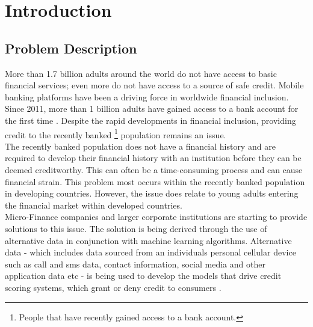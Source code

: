 \chapter{Introduction} 
\label{Chapter1}

\section{Problem Description}

More than 1.7 billion adults around the world do not have access to basic financial services; even more do not have access to a source of safe credit. Mobile banking platforms have been a driving force in worldwide financial inclusion. Since 2011, more than 1 billion adults have gained access to a bank account for the first time \parencite{WorldBank}. Despite the rapid developments in financial inclusion, providing credit to the recently banked \footnote{People that have recently gained access to a bank account.} population remains an issue. \\

The recently banked population does not have a financial history and are required to develop their financial history with an institution before they can be deemed creditworthy. This can often be a time-consuming process and can cause financial strain. This problem most occurs within the recently banked population in developing countries. However, the issue does relate to young adults entering the financial market within developed countries. \\

Micro-Finance companies and larger corporate institutions are starting to provide solutions to this issue. The solution is being derived through the use of alternative data in conjunction with machine learning algorithms. Alternative data - which includes data sourced from an individuals personal cellular device such as call and sms data, contact information, social media and other application data etc - is being used to develop the models that drive credit scoring systems, which grant or deny credit to consumers \parencite{BigDataMicroFiance}. 


